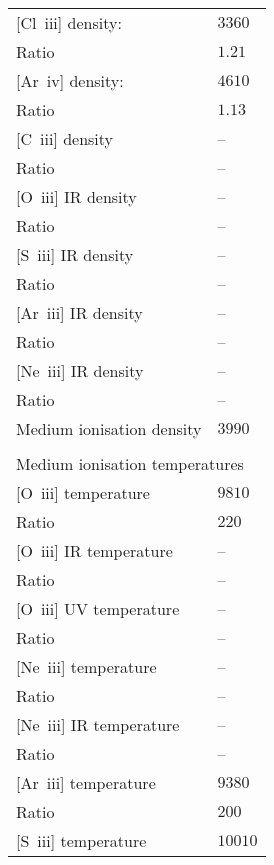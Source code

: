 \begin{longtable}[l]{ll}
 {}[Cl~{\sc iii}] density:           & $ 3360$\\
 Ratio                               & $  1.21$\\
 {}[Ar~{\sc iv}] density:            & $ 4610$\\
 Ratio                               & $  1.13$\\
 {}[C~{\sc iii}] density             & -- \\
 Ratio                               & -- \\
 {}[O~{\sc iii}] IR density          & -- \\
 Ratio                               & -- \\
 {}[S~{\sc iii}] IR density          & -- \\
 Ratio                               & -- \\
 {}[Ar~{\sc iii}] IR density         & -- \\
 Ratio                               & -- \\
 {}[Ne~{\sc iii}] IR density         & -- \\
 Ratio                               & -- \\
 Medium ionisation density           & $ 3990$\\
 \vspace{0.2cm}\\\multicolumn{2}{l}{Medium ionisation temperatures}\\ \hline
 {}[O~{\sc iii}] temperature         & $ 9810$\\
 Ratio                               & $  220$\\
 {}[O~{\sc iii}] IR temperature      & -- \\
 Ratio                               & -- \\
 {}[O~{\sc iii}] UV temperature      & -- \\
 Ratio                               & -- \\
 {}[Ne~{\sc iii}] temperature        & -- \\
 Ratio                               & -- \\
 {}[Ne~{\sc iii}] IR temperature     & -- \\
 Ratio                               & -- \\
 {}[Ar~{\sc iii}] temperature        & $ 9380$\\
 Ratio                               & $  200$\\
 {}[S~{\sc iii}] temperature         & $10010$\\

\end{longtable}
